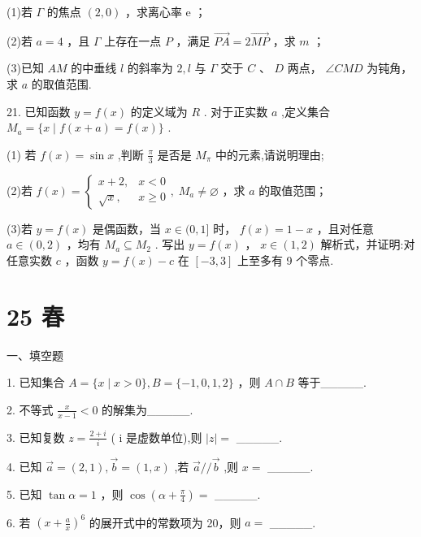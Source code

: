 \documentclass[10pt]{article}
\begin{document}
(1)若 \(\Gamma\) 的焦点 \(\left( {2,0}\right)\) ，求离心率 \(\mathrm{e}\) ；

(2)若 \(a = 4\) ，且 \(\Gamma\) 上存在一点 \(P\) ，满足 \(\overrightarrow{PA} = 2\overrightarrow{MP}\) ，求 \(m\) ；

(3)已知 \({AM}\) 的中垂线 \(l\) 的斜率为 \(2,l\) 与 \(\Gamma\) 交于 \(C\) 、 \(D\) 两点， \(\angle {CMD}\) 为钝角，求 \(a\) 的取值范围.

21. 已知函数 \(y = f\left( x\right)\) 的定义域为 \(R\) . 对于正实数 \(a\) ,定义集合 \({M}_{a} = \{ x \mid  f\left( {x + a}\right)  = f\left( x\right) \}\) .

(1) 若 \(f\left( x\right)  = \sin x\) ,判断 \(\frac{\pi }{3}\) 是否是 \({M}_{\pi }\) 中的元素,请说明理由;

(2)若 \(f\left( x\right)  = \left\{  {\begin{array}{ll} x + 2, & x < 0 \\  \sqrt{x}, & x \geq  0 \end{array},\;{M}_{a} \neq  \varnothing }\right.\) ，求 \(a\) 的取值范围；

(3)若 \(y = f\left( x\right)\) 是偶函数，当 \(x \in  (0,1\rbrack\) 时， \(f\left( x\right)  = 1 - x\) ，且对任意 \(a \in  \left( {0,2}\right)\) ，均有 \({M}_{a} \subseteq  {M}_{2}\) . 写出 \(y = f\left( x\right)\) ， \(x \in  \left( {1,2}\right)\) 解析式，并证明:对任意实数 \(c\) ，函数 \(y = f\left( x\right)  - c\) 在 \(\left\lbrack  {-3,3}\right\rbrack\) 上至多有 9 个零点.

\section*{25 春}

一、填空题

1. 已知集合 \(A = \{ x \mid  x > 0\} ,B = \{  - 1,0,1,2\}\) ，则 \(A \cap  B\) 等于\_\_\_\_\_.

2. 不等式 \(\frac{x}{x - 1} < 0\) 的解集为\_\_\_\_\_.

3. 已知复数 \(z = \frac{2 + i}{i}\) ( \(\mathrm{i}\) 是虚数单位),则 \(\left| z\right|  =\) \_\_\_\_\_.

4. 已知 \(\overrightarrow{a} = \left( {2,1}\right) ,\overrightarrow{b} = \left( {1,x}\right)\) ,若 \(\overrightarrow{a}//\overrightarrow{b}\) ,则 \(x =\) \_\_\_\_\_.

5. 已知 \(\tan \alpha  = 1\) ，则 \(\cos \left( {\alpha  + \frac{\pi }{4}}\right)  =\) \_\_\_\_\_.

6. 若 \({\left( x + \frac{a}{x}\right) }^{6}\) 的展开式中的常数项为 20，则 \(a =\) \_\_\_\_\_.
\end{document}
